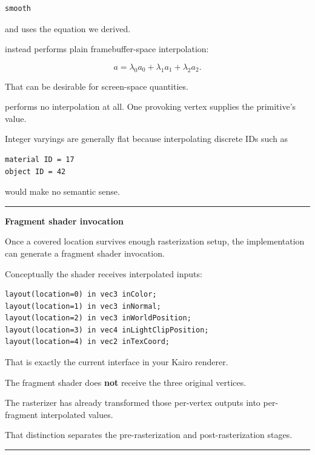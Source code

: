\begin{verbatim}
smooth
\end{verbatim}

and uses the equation we derived.

 instead performs plain framebuffer-space interpolation:

\[
a=
\lambda_0a_0+
\lambda_1a_1+
\lambda_2a_2.
\]

That can be desirable for screen-space quantities.

 performs no interpolation at all. One provoking vertex supplies the primitive's value.

Integer varyings are generally flat because interpolating discrete IDs such as

\begin{verbatim}
material ID = 17
object ID = 42
\end{verbatim}

would make no semantic sense.

\begin{center}\rule{0.5\linewidth}{0.5pt}\end{center}

\textbf{Fragment shader invocation}

Once a covered location survives enough rasterization setup, the implementation can generate a fragment shader invocation.

Conceptually the shader receives interpolated inputs:

\begin{verbatim}
layout(location=0) in vec3 inColor;
layout(location=1) in vec3 inNormal;
layout(location=2) in vec3 inWorldPosition;
layout(location=3) in vec4 inLightClipPosition;
layout(location=4) in vec2 inTexCoord;
\end{verbatim}

That is exactly the current  interface in your Kairo renderer.

The fragment shader does \textbf{not} receive the three original vertices.

The rasterizer has already transformed those per-vertex outputs into per-fragment interpolated values.

That distinction separates the pre-rasterization and post-rasterization stages.

\begin{center}\rule{0.5\linewidth}{0.5pt}\end{center}

